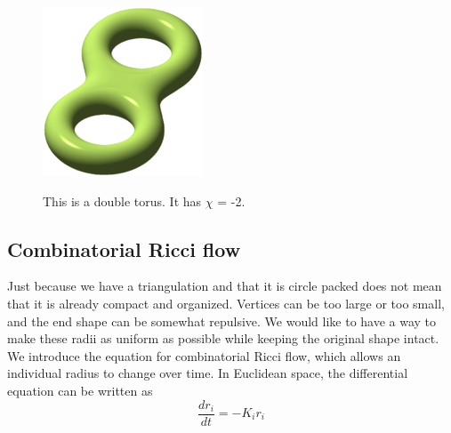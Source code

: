 \documentclass[12pt]{article}
\begin{document}
\begin{figure}
\centering
\includegraphics[scale = 2.0]{180px-Double_torus_illustration.png}
\caption{This is a double torus. It has $\chi$ = -2.}\noindent \hrulefill
\label{test}
\end{figure}

%  
  \subsection{Combinatorial Ricci flow}
  \maketitle  
Just because we have a triangulation and that it is circle packed does not mean that it is already compact and organized. Vertices can be too large or too small, and the end shape can be somewhat repulsive. We would like to have a way to make these radii as uniform as possible while keeping the original shape intact. We introduce the equation for combinatorial Ricci flow, which allows an individual radius to change over time. In Euclidean space, the differential equation can be written as 
  \begin{equation}
  \label{Riccif}
  \frac{dr_i}{{dt}} = -K_ir_i
  \end{equation}
  
\end{document}
